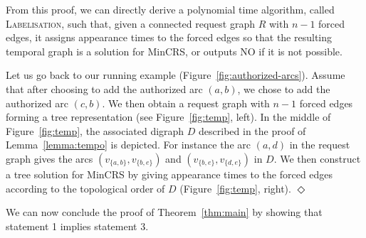 \documentclass[11pt]{article}%
\begin{document}
From this proof, we can directly derive a polynomial time algorithm, called \textsc{Labelisation}, such that, given a connected request graph $R$ with $n-1$ forced edges, it assigns appearance times to the forced edges so that the resulting temporal graph is a solution for MinCRS, or outputs NO if it is not possible. 

\begin{example}
Let us go back to our running example (Figure~\ref{fig:authorized-arcs}). Assume that after choosing to add the authorized arc $(a,b)$, we chose to add the authorized arc $(c,b)$. We then obtain a request graph with $n-1$ forced edges forming a tree representation (see Figure~\ref{fig:temp}, left). In the middle of Figure~\ref{fig:temp}, the associated digraph $D$ described in the proof of Lemma~\ref{lemma:tempo} is depicted. For instance the arc $(a,d)$ in the request graph gives the arcs $(v_{\{a,b\}},v_{\{b,e\}})$ and $(v_{\{b,e\}},v_{\{d,e\}})$ in $D$. We then construct a tree solution for MinCRS by giving appearance times to the forced edges according to the topological order of $D$ (Figure~\ref{fig:temp}, right).\hfill{} $\Diamond$
\end{example}

We can now conclude the proof of Theorem~\ref{thm:main} by showing that statement 1 implies statement 3. 
\end{document}
